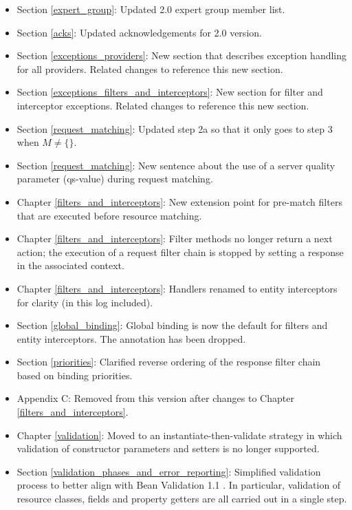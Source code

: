\begin{itemize}
\item Section \ref{expert_group}: Updated 2.0 expert group member list.
\item Section \ref{acks}: Updated acknowledgements for 2.0 version.
\item Section \ref{exceptions_providers}: New section that describes exception handling for all providers. Related changes to reference this new section.
\item Section \ref{exceptions_filters_and_interceptors}: New section for filter and interceptor exceptions. Related changes to reference this new section.
\item Section \ref{request_matching}: Updated step 2a so that it only goes to step 3 when $M \neq \{\}$. 
\item Section \ref{request_matching}: New sentence about the use of a server quality parameter (qs-value) during request matching.
\item Chapter \ref{filters_and_interceptors}: New extension point for pre-match filters that are executed before resource matching.
\item Chapter \ref{filters_and_interceptors}: Filter methods no longer return a next action; the execution of a request filter chain is stopped by setting a response in the associated context.
\item Chapter \ref{filters_and_interceptors}: Handlers renamed to entity interceptors for clarity (in this log included).
\item Section \ref{global_binding}: Global binding is now the default for filters and entity interceptors. The annotation  has been dropped.
\item Section \ref{priorities}: Clarified reverse ordering of the response filter chain based on binding priorities.
\item Appendix C: Removed from this version after changes to Chapter \ref{filters_and_interceptors}.
\item Chapter \ref{validation}: Moved to an instantiate-then-validate strategy in which validation of constructor parameters and setters is no longer supported.
\item Section \ref{validation_phases_and_error_reporting}: Simplified validation process to better align with Bean Validation 1.1 \cite{bv11}. In particular, validation of resource classes, fields and property getters are all carried out in a single step.

\end{itemize}

